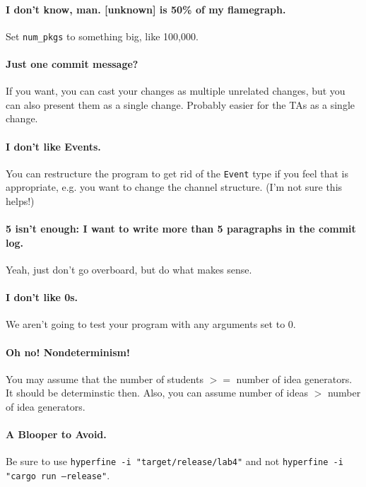 \paragraph{I don't know, man. [unknown] is 50\% of my flamegraph.} Set \texttt{num\_pkgs} to something big, like 100,000.

\paragraph{Just one commit message?} If you want, you can cast your changes as multiple unrelated changes, but you can also 
present them as a single change. Probably easier for the TAs as a single change.

\paragraph{I don't like Events.} You can restructure the program to get rid of the \texttt{Event} type if you feel that is
appropriate, e.g. you want to change the channel structure. (I'm not sure this helps!)

\paragraph{5 isn't enough: I want to write more than 5 paragraphs in the commit log.} Yeah, just don't go overboard, but do
what makes sense.

\paragraph{I don't like 0s.} We aren't going to test your program with any arguments set to 0.

\paragraph{Oh no! Nondeterminism!} You may assume that the number of students $>=$ number of idea generators.
It should be determinstic then. Also, you can assume number of ideas $>$ number of idea generators.

\paragraph{A Blooper to Avoid.} Be sure to use \texttt{hyperfine -i "target/release/lab4"} and not 
\texttt{hyperfine -i "cargo run --release"}.


